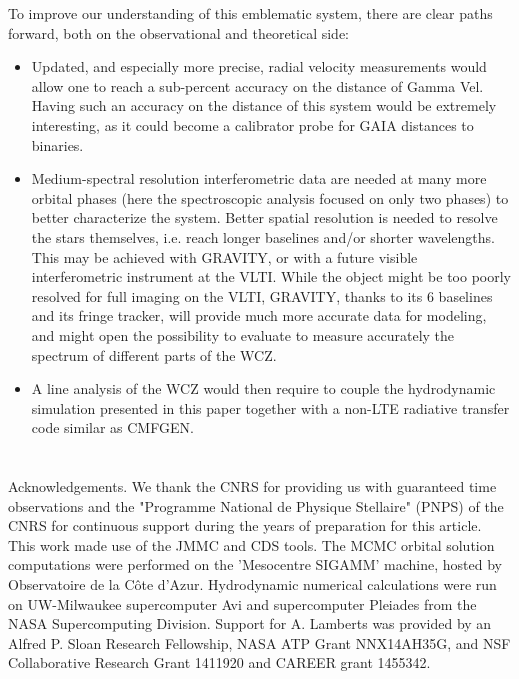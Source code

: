 \documentclass[usenatbib]{mnras}%
\begin{document}
To improve our understanding of this emblematic system, there are clear paths forward, both on the observational and theoretical side:
\begin{itemize}
\item Updated, and especially more precise, radial velocity measurements would allow one to reach a sub-percent accuracy on the distance of Gamma Vel. Having such an accuracy on the distance of this system would be extremely interesting, as it could become a calibrator probe for GAIA distances to binaries.
\item Medium-spectral resolution interferometric data are needed at many more orbital phases (here the spectroscopic analysis focused on only two phases) to better characterize the system. Better spatial resolution is needed to resolve  the stars themselves, i.e. reach longer baselines and/or shorter wavelengths. This may be achieved with GRAVITY, or with a future visible interferometric instrument at the VLTI.  While the object might be too poorly resolved for full imaging on the VLTI, GRAVITY, thanks to its 6 baselines and its fringe tracker, will provide much more accurate data for modeling, and might open the possibility to evaluate to measure accurately the spectrum of different parts of the WCZ. 
\item A line analysis of the WCZ would then require to couple the hydrodynamic simulation presented in this paper together with a non-LTE radiative transfer code similar as CMFGEN.
\end{itemize}


\section*{}{Acknowledgements.}
We thank the CNRS for providing us with guaranteed time observations and the "Programme National de Physique Stellaire" (PNPS) of the CNRS for continuous support during the years of preparation for this article. This work made use of the JMMC and CDS tools. The MCMC orbital solution computations were performed on the ’Mesocentre SIGAMM’ machine, hosted by Observatoire de la C\^ote d’Azur. Hydrodynamic numerical calculations were run on UW-Milwaukee supercomputer Avi and supercomputer Pleiades from the NASA Supercomputing Division. Support for A. Lamberts was provided by an Alfred P. Sloan Research Fellowship, NASA ATP Grant NNX14AH35G, and NSF Collaborative Research Grant 1411920 and CAREER grant 1455342. 


\end{document}
